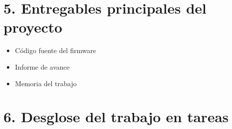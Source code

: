 \documentclass[11pt]{charter}
\begin{document}
\section{5. Entregables principales del proyecto}
\label{sec:entregables}

\begin{itemize}
\item Código fuente del firmware
\item Informe de avance
\item Memoria del trabajo
\end{itemize}

\section{6. Desglose del trabajo en tareas}
\label{sec:wbs}
\end{document}
